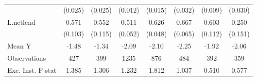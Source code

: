 {\begin{tabular}{l*{7}{c}}
            &     (0.025)         &     (0.025)         &     (0.012)         &     (0.015)         &     (0.032)         &     (0.009)         &     (0.030)         \\
\addlinespace
L.netlend   &       0.571\sym{***}&       0.552\sym{***}&       0.511\sym{***}&       0.626\sym{***}&       0.667\sym{***}&       0.603\sym{***}&       0.250\sym{*}  \\
            &     (0.103)         &     (0.115)         &     (0.052)         &     (0.048)         &     (0.065)         &     (0.112)         &     (0.151)         \\
\midrule
Mean Y      &       -1.48         &       -1.34         &       -2.09         &       -2.10         &       -2.25         &       -1.92         &       -2.06         \\
Observations&         427         &         399         &        1235         &         876         &         484         &         392         &         359         \\
Exc. Inst. F-stat&       1.385         &       1.306         &       1.232         &       1.812         &       1.037         &       0.510         &       0.577         \\
\bottomrule
\end{tabular}
}
